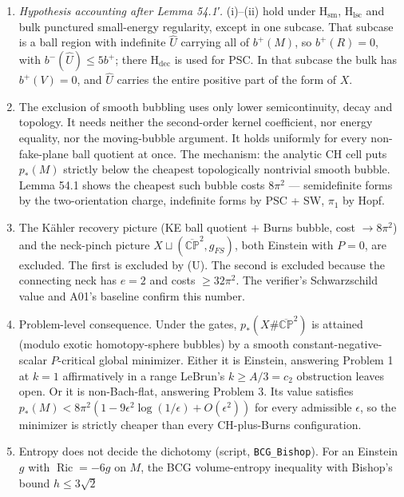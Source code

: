 \documentclass[
  10pt,
]{report}
\begin{document}
\begin{enumerate}
\def\labelenumi{\arabic{enumi}.}
\setcounter{enumi}{-1}
\item
  \emph{Hypothesis accounting after Lemma 54.1′.} (i)--(ii) hold under
  \(\mathrm{H_{sm}}\), \(\mathrm{H_{lsc}}\) and bulk punctured
  small-energy regularity, except in one subcase. That subcase is a ball
  region with indefinite \(\widehat U\) carrying all of \(b^+(M)\), so
  \(b^+(R)=0\), with \(b^-(\widehat U)\le5b^+\); there
  \(\mathrm{H_{dec}}\) is used for PSC. In that subcase the bulk has
  \(b^+(V)=0\), and \(\widehat U\) carries the entire positive part of
  the form of \(X\).
\item
  The exclusion of smooth bubbling uses only lower semicontinuity, decay
  and topology. It needs neither the second-order kernel coefficient,
  nor energy equality, nor the moving-bubble argument. It holds
  uniformly for every non-fake-plane ball quotient at once. The
  mechanism: the analytic CH cell puts \(p_*(M)\) strictly below the
  cheapest topologically nontrivial smooth bubble. Lemma 54.1 shows the
  cheapest such bubble costs \(8\pi^2\) --- semidefinite forms by the
  two-orientation charge, indefinite forms by PSC + SW, \(\pi_1\) by
  Hopf.
\item
  The Kähler recovery picture (KE ball quotient \(+\) Burns bubble, cost
  \(\to8\pi^2\)) and the neck-pinch picture
  \(X\sqcup(\overline{\mathbb{CP}}^2,g_{FS})\), both Einstein with
  \(P=0\), are excluded. The first is excluded by (U). The second is
  excluded because the connecting neck has \(e=2\) and costs
  \(\ge32\pi^2\). The verifier's Schwarzschild value and A01's baseline
  confirm this number.
\item
  Problem-level consequence. Under the gates,
  \(p_*(X\#\overline{\mathbb{CP}}^2)\) is attained (modulo exotic
  homotopy-sphere bubbles) by a smooth constant-negative-scalar
  \(P\)-critical global minimizer. Either it is Einstein, answering
  Problem 1 at \(k=1\) affirmatively in a range LeBrun's
  \(k\ge A/3=c_2\) obstruction leaves open. Or it is non-Bach-flat,
  answering Problem 3. Its value satisfies
  \(p_*(M)<8\pi^2(1-9\epsilon^2\log(1/\epsilon)+O(\epsilon^2))\) for
  every admissible \(\epsilon\), so the minimizer is strictly cheaper
  than every CH-plus-Burns configuration.
\item
  Entropy does not decide the dichotomy (script, \texttt{BCG\_Bishop}).
  For an Einstein \(g\) with \(\operatorname{Ric}=-6g\) on \(M\), the
  BCG volume-entropy inequality with Bishop's bound \(h\le3\sqrt2\)

\end{enumerate}
\end{document}
